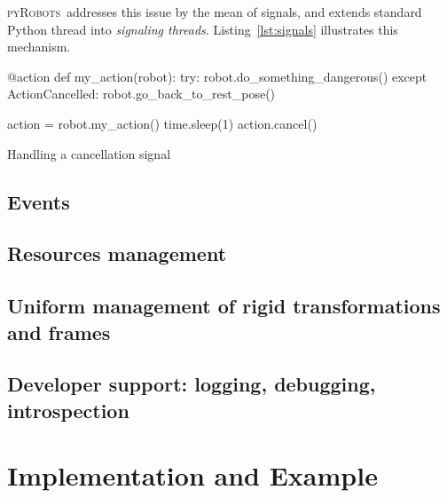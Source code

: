 \documentclass[a4paper, 10pt, conference]{ieeeconf}      %
\newcommand{\pyRobots}{\textsc{pyRobots}\ }
\begin{document}
\pyRobots addresses this issue by the mean of signals, and extends standard
Python thread into \emph{signaling threads}. Listing~\ref{lst:signals}
illustrates this mechanism.

\begin{listing}[H]
\begin{pythoncode}
    @action
    def my_action(robot):
      try:
        robot.do_something_dangerous()
      except ActionCancelled:
        robot.go_back_to_rest_pose()

    action = robot.my_action()
    time.sleep(1)
    action.cancel()
\end{pythoncode}
\caption{Handling a cancellation signal}
\label{lst:signals}
\end{listing}

\subsection{Events}

\subsection{Resources management}

\subsection{Uniform management of rigid transformations and frames}

\subsection{Developer support: logging, debugging, introspection}
\label{}

\section{Implementation and Example}

\end{document}
